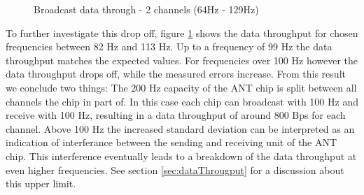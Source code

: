\begin{description}
\begin{figure}[H]
			\caption{Broadcast data through - 2 channels (64Hz - 129Hz)}\label{fig:exp2high}
		\end{figure}
	To further investigate this drop off, figure \ref{fig:exp2high} shows the data throughput for chosen frequencies between 82 Hz and 113 Hz. Up to a frequency of 99 Hz the data throughput matches the expected values. For frequencies over 100 Hz however the data throughput drops off, while the measured errors increase. From this result we conclude two things: The 200 Hz capacity of the ANT chip is split between all channels the chip in part of. In this case each chip can broadcast with 100 Hz and receive with 100 Hz, resulting in a data throughput of around 800 Bps for each channel. Above 100 Hz the increased standard deviation can be interpreted as an indication of interferance between the sending and receiving unit of the ANT chip. This interference eventually leads to a breakdown of the data throughput at even higher frequencies.	
	See section \ref{sec:dataThrougput} for a discussion about this upper limit. 	
	
\end{description}
\newpage


